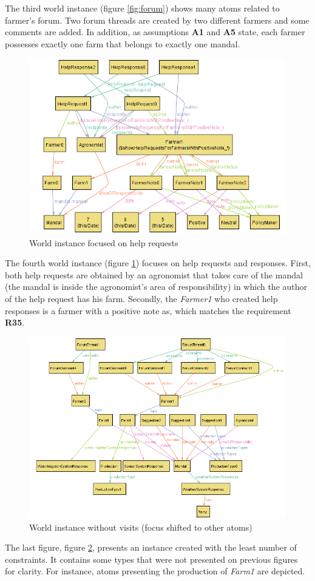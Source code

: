 The third world instance (figure \ref{fig:forum}) shows many atoms related to farmer's forum. Two forum threads are created by two different farmers and some comments are added. In addition, as assumptions \textbf{A1} and \textbf{A5} state, each farmer possesses exactly one farm that belongs to exactly one mandal. 

\begin{figure}[H]
    \centering
    \includegraphics[width=\textwidth, keepaspectratio, origin=c]{alloy/world_instances/showHelpRequestsForFarmersWithPositiveNote2.png}
    \caption{World instance focused on help requests}
    \label{fig:help_requests}
\end{figure}
The fourth world instance (figure \ref{fig:help_requests}) focuses on help requests and responses. First, both help requests are obtained by an agronomist that takes care of the mandal (the mandal is inside the agronomist's area of responsibility) in which the author of the help request has his farm. Secondly, the \textit{Farmer1} who created help responses is a farmer with a positive note as, which matches the requirement \textbf{R35}.


\begin{figure}[H]
    \centering
    \includegraphics[width=\textwidth, keepaspectratio, origin=c]{alloy/world_instances/General2.png}
    \caption{World instance without visits (focus shifted to other atoms)}
    \label{fig:general_world}
\end{figure}

The last figure, figure \ref{fig:general_world}, presents an instance created with the least number of constraints. It contains some types that were not presented on previous figures for clarity. For instance, atoms presenting the production of \textit{Farm1} are depicted.